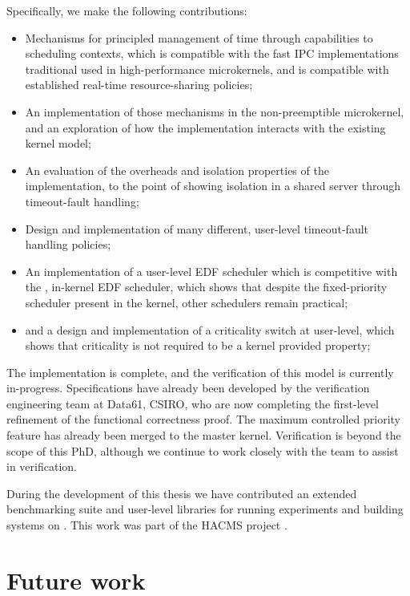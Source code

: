 Specifically, we make the following contributions:

\begin{itemize}
    \item Mechanisms for principled management of time through capabilities to scheduling contexts,
        which is compatible with the fast IPC implementations traditional used in high-performance
        microkernels, and is compatible with established real-time resource-sharing policies;
    \item An implementation of those mechanisms in the non-preemptible \selfour microkernel, and an
        exploration of how the implementation interacts with the existing kernel model;
    \item An evaluation of the overheads and isolation properties of the implementation, to the
        point of showing isolation in a shared server through timeout-fault handling;
    \item Design and implementation of many different, user-level timeout-fault handling policies;
    \item An implementation of a user-level \gls{EDF} scheduler which is competitive with the
        \litmus, in-kernel EDF scheduler, which shows that despite the fixed-priority scheduler
        present in the kernel, other schedulers remain practical;
    \item and a design and implementation of a criticality switch at user-level, which shows that
        criticality is not required to be a kernel provided property;
\end{itemize}

The implementation is complete, and the verification of this model is currently in-progress.
Specifications have already been developed by the verification engineering team at Data61, CSIRO,
who are now completing the first-level refinement of the functional correctness proof.
The maximum controlled priority feature has already been merged to the master kernel. 
Verification is beyond the scope of this PhD, although we continue to work closely with
the team to assist in verification. 

During the development of this thesis we have contributed an extended benchmarking suite and
user-level libraries for running experiments and building systems on \selfour. This work was part of
the HACMS project . 

\section{Future work}

